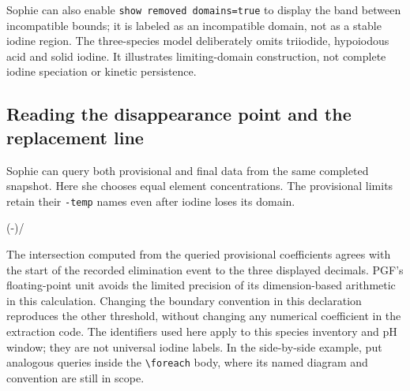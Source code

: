 \documentclass[a4paper,11pt]{ltxdoc}
\begin{document}
Sophie can also enable \texttt{show removed domains=true} to display the band
between incompatible bounds; it is labeled as an incompatible domain, not as a
stable iodine region. The three-species model deliberately omits triiodide,
hypoiodous acid and solid iodine. It illustrates limiting-domain construction,
not complete iodine speciation or kinetic persistence.

\subsection{Reading the disappearance point and the replacement line}
Sophie can query both provisional and final data from the same completed
snapshot. Here she chooses equal element concentrations. The provisional limits
retain their \texttt{-temp} names even after iodine loses its domain.

\begin{codeexample}[width=0pt]
\IHandle
{}
\pgfmathsetmacro\intersection
  {(\lowerIntercept-\upperIntercept)/\upperSlope}
\end{codeexample}

The intersection computed from the queried provisional coefficients agrees with
the start of the recorded elimination event to the three displayed decimals.
PGF's floating-point unit avoids
the limited precision of its dimension-based arithmetic in this calculation.
Changing the boundary convention
in this declaration reproduces the other threshold, without changing any
numerical coefficient in the extraction code. The identifiers used here apply
to this species inventory and pH window; they are not universal iodine labels.
In the side-by-side example, put analogous queries inside the \verb|\foreach|
body, where its named diagram and convention are still in scope.
\end{document}
